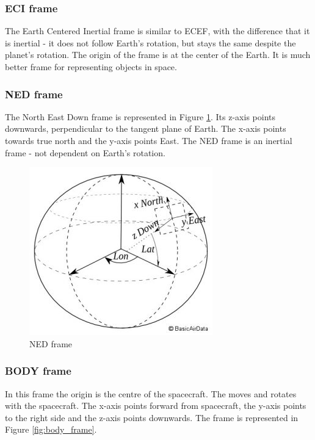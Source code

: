 \documentclass[12pt,a4paper,oneside]{article}
\begin{document}
\subsubsection{ECI frame}
The Earth Centered Inertial frame is similar to ECEF, with the difference that it is inertial - it does not follow Earth's rotation, but stays the same despite the planet's rotation. The origin of the frame is at the center of the Earth. It is much better frame for representing objects in space.
\citet{larson1992space}

\subsubsection{NED frame}
The North East Down frame is represented in Figure \ref{fig:ned_frame}. Its z-axis points downwards, perpendicular to the tangent plane of Earth. The x-axis points towards true north and the y-axis points East. The NED frame is an inertial frame - not dependent on Earth's rotation.

\begin{figure}[!htb]
\includegraphics[scale=0.6]{ned_frame.jpg}
\centering
\caption{NED frame \cite{ned-frame-image}}
\label{fig:ned_frame}
\end{figure}

\subsubsection{BODY frame}
In this frame the origin is the centre of the spacecraft. The moves and rotates with the spacecraft. The x-axis points forward from spacecraft, the y-axis points to the right side and the z-axis points downwards. The frame is represented in Figure \ref{fig:body_frame}.
\end{document}
